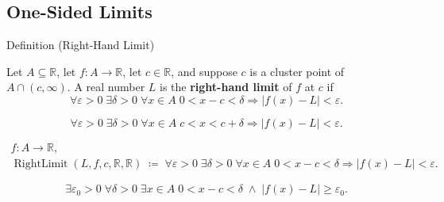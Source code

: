 
\subsection*{One-Sided Limits}
\label{sec:one-sided-limits}

\begin{definitionbox}{Definition (Right-Hand Limit)}
\begin{definition}
\label{def:right-hand-limit}
Let $A\subseteq\mathbb{R}$, let $f:A\to\mathbb{R}$, let $c\in\mathbb{R}$,
and suppose $c$ is a cluster point of $A\cap(c,\infty)$. A real number
$L$ is the \textbf{right-hand limit} of $f$ at $c$ if
\[
  \forall\varepsilon>0\;\exists\delta>0\;\forall x\in A\;
  0<x-c<\delta\Rightarrow |f(x)-L|<\varepsilon.
\]
\end{definition}
\end{definitionbox}

\begin{remark*}
\[
  \forall\varepsilon>0\;\exists\delta>0\;\forall x\in A\;
  c<x<c+\delta\Rightarrow |f(x)-L|<\varepsilon.
\]
\end{remark*}

\begin{remark*}
\[
\begin{aligned}
  f\colon A\to\mathbb{R},\\
  \operatorname{RightLimit}(L,f,c,\mathbb{R},\mathbb{R})
  \;\coloneqq\;
  \forall\varepsilon>0\;\exists\delta>0\;\forall x\in A\;
  0<x-c<\delta\Rightarrow |f(x)-L|<\varepsilon.
\end{aligned}
\]
\end{remark*}

\begin{remark*}
\[
  \exists\varepsilon_0>0\;\forall\delta>0\;\exists x\in A\;
  0<x-c<\delta\;\wedge\; |f(x)-L|\geq\varepsilon_0.
\]
\end{remark*}

